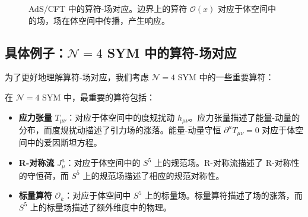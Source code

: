 \begin{figure}[htbp]
\centering
{}
\caption{AdS/CFT 中的算符-场对应。边界上的算符 $\mathcal{O}(x)$ 对应于体空间中的场，场在体空间中传播，产生响应。}
\label{fig:operator_field}
\end{figure}

\subsection{具体例子：$\mathcal{N}=4$ SYM 中的算符-场对应}

为了更好地理解算符-场对应，我们考虑 $\mathcal{N}=4$ SYM 中的一些重要算符：

\begin{example}[$\mathcal{N}=4$ SYM 中的算符-场对应]
在 $\mathcal{N}=4$ SYM 中，最重要的算符包括：
\begin{itemize}
    \item \textbf{应力张量} $T_{\mu\nu}$：对应于体空间中的度规扰动 $h_{\mu\nu}$。应力张量描述了能量-动量的分布，而度规扰动描述了引力场的涨落。能量-动量守恒 $\partial^\mu T_{\mu\nu} = 0$ 对应于体空间中的爱因斯坦方程。
    \item \textbf{R-对称流} $J_\mu^a$：对应于体空间中的 $S^5$ 上的规范场。R-对称流描述了 R-对称性的守恒荷，而 $S^5$ 上的规范场描述了相应的规范对称性。
    \item \textbf{标量算符} $\mathcal{O}_k$：对应于体空间中 $S^5$ 上的标量场。标量算符描述了场的涨落，而 $S^5$ 上的标量场描述了额外维度中的物理。
\end{itemize}
\end{example}


